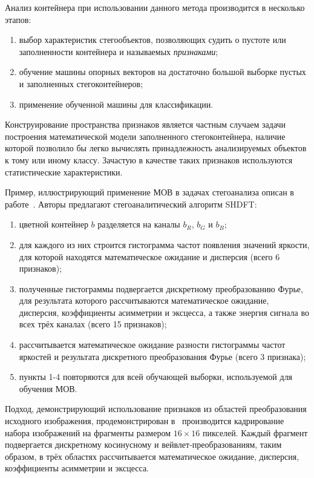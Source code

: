 Анализ контейнера при использовании данного метода производится в несколько этапов:
\begin{enumerate}
\item выбор характеристик стегообъектов, позволяющих судить о пустоте или заполненности контейнера и называемых \textit{признаками};
\item обучение машины опорных векторов на достаточно большой выборке пустых и заполненных стегоконтейнеров;
\item применение обученной машины для классификации.
\end{enumerate}

Конструирование пространства признаков является частным случаем задачи построения математической модели заполненного стегоконтейнера, наличие которой позволило бы легко вычислять принадлежность анализируемых объектов к тому или иному классу. Зачастую в качестве таких признаков используются статистические характеристики.

Пример, иллюстрирующий применение МОВ в задачах стегоанализа описан в работе~\cite{HistogramDFTSVM}. Авторы предлагают стегоаналитический алгоритм SHDFT:
\begin{enumerate}
\item цветной контейнер $ b $ разделяется на каналы $ b_R $, $ b_G $ и $ b_B $;
\item для каждого из них строится гистограмма частот появления значений яркости, для которой находятся математическое ожидание и дисперсия (всего 6 признаков);
\item полученные гистограммы подвергается дискретному преобразованию Фурье, для результата которого рассчитываются математическое ожидание, дисперсия, коэффициенты асимметрии и эксцесса, а также энергия сигнала во всех трёх каналах (всего 15 признаков);
\item рассчитывается математическое ожидание разности гистограммы частот яркостей и результата дискретного преобразования Фурье (всего 3 признака);
\item пункты 1-4 повторяются для всей обучающей выборки, используемой для обучения МОВ.
\end{enumerate}

Подход, демонстрирующий использование признаков из областей преобразования исходного изображения, продемонстрирован в~\cite{RishidasS2015} производится кадрирование набора изображений на фрагменты размером $ 16 \times 16 $ пикселей. Каждый фрагмент подвергается дискретному косинусному и вейвлет-преобразованиям, таким образом, в трёх областях рассчитывается математическое ожидание, дисперсия, коэффициенты асимметрии и эксцесса.

\clearpage